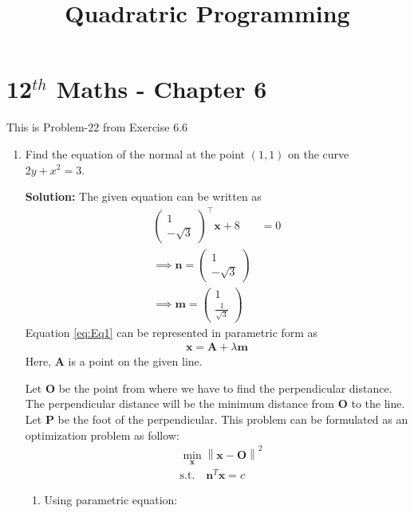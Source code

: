 \documentclass[12pt]{article}
\providecommand{\norm}[1]{\left\lVert#1\right\rVert}
\newcommand{\solution}{\noindent \textbf{Solution: }}
\newcommand{\myvec}[1]{\ensuremath{\begin{pmatrix}#1\end{pmatrix}}}
\let\vec\mathbf
\begin{document}
\begin{center}
	\title{\textbf{Quadratric Programming}}
\date{\vspace{-5ex}} %
\maketitle
\end{center}
\setcounter{page}{1}

\section{12$^{th}$ Maths - Chapter 6}
This is Problem-22 from Exercise 6.6 
\begin{enumerate}
\item Find the equation of the normal at the point $(1,1)$ on the curve $2y + x^2 = 3$. 

\solution 
The given equation can be written as
\begin{align}
	\label{eq:Eq1}
	\myvec{1 \\ -\sqrt{3}}^\top\vec{x}+8 &= 0 \\
	\implies \vec{n} = \myvec{1 \\ -\sqrt{3}} \\
	\implies \vec{m} = \myvec{1 \\ \frac{1}{\sqrt{3}}}
\end{align}
Equation \eqref{eq:Eq1} can be represented in parametric form as
\begin{align}
	\label{eq:Eq2}
	\vec{x} = \vec{A}+\lambda\vec{m}
\end{align}
Here, $\vec{A}$ is a point on the given line. 

Let $\vec{O}$ be the point from where we have to find the perpendicular distance. The perpendicular distance will be the minimum distance from $\vec{O}$ to the line. Let $\vec{P}$ be the foot of the perpendicular. This problem can be formulated as an optimization problem as follow:
\begin{align}
	\label{eq:Eq3}
	&  \min_{\vec{x}} \norm{\vec{x}-\vec{O}}^2\\
	& \text{s.t.} \quad \vec{n}^T\vec{x} = c 
\end{align}
\begin{enumerate}
\item Using parametric equation:


\end{enumerate}
\end{enumerate}
\end{document}
